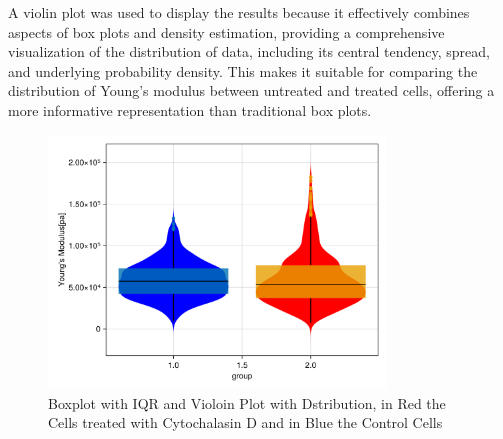 \documentclass[a4paper,english,12pt,bibliography=totoc]{scrreprt}
\begin{document}


A violin plot was used to display the results because it effectively combines aspects of box plots and density estimation, providing a comprehensive visualization of the distribution of data, including its central tendency, spread, and underlying probability density. This makes it suitable for comparing the distribution of Young's modulus between untreated and treated cells, offering a more informative representation than traditional box plots.

\begin{figure}[H]
    \centering
    \includegraphics[width=0.8\textwidth]{HistogramsAndViolinplot/violinplot.png}
    \caption{Boxplot with IQR and Violoin Plot with Dstribution, in Red the Cells treated with Cytochalasin D and in Blue the Control Cells}
    \label{fig:ViolinPlot}
\end{figure}

%
%
\end{document}
